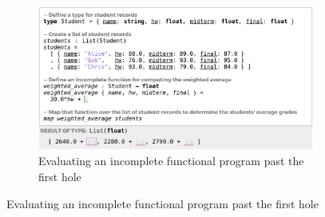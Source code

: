 
\begin{figure}[t]
\begin{subfigure}[t]{\textwidth}
\centering
\includegraphics[width=\textwidth,interpolate=false]{images/grades-cell-mockup.png}
\vspace{-3px}
\caption{Evaluating an incomplete functional program past the first hole}
\label{fig:grades-cell-mockup}
\end{subfigure}

\vspace{10px}


\end{figure}
